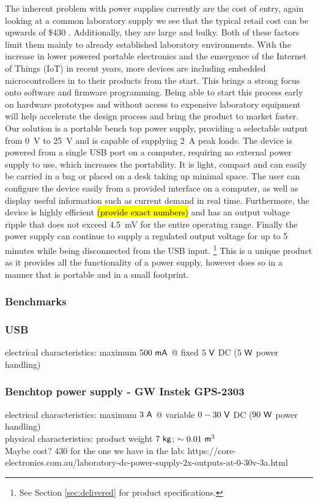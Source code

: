 \newpar
The inherent problem with power supplies currently are the cost of entry, again looking at a common laboratory supply we see that the typical retail cost can be upwards of \$430 \cite{labsupply_price}. Additionally, they are large and bulky. Both of these factors limit them mainly to already established laboratory environments. With the increase in lower powered portable electronics and the emergence of the Internet of Things (IoT) in recent years, more devices are including embedded microcontrollers in to their products from the start. This brings a strong focus onto software and firmware programming. Being able to start this process early on hardware prototypes and without access to expensive laboratory equipment will help accelerate the design process and bring the product to market faster. 
\newpar
Our solution is a portable bench top power supply, providing a selectable output from \SI{0}{V} to \SI{25}{V} and is capable of supplying \SI{2}{A} peak loads. The device is powered from a single USB port on a computer, requiring no external power supply to use, which increases the portability. It is light, compact and can easily be carried in a bag or placed on a desk taking up minimal space. The user can configure the device easily from a provided interface on a computer, as well as display useful information such as current demand in real time. Furthermore, the device is highly efficient \hl{(provide exact numbers)} and has an output voltage ripple that does not exceed \SI{4.5}{mV} for the entire operating range.  Finally the power supply can continue to supply a regulated output voltage for up to 5 minutes while being disconnected from the USB input. \footnote{See Section \ref{sec:delivered} for product specifications.}
\newpar
This is a unique product as it provides all the functionality of a power supply, however does so in a manner that is portable and in a small footprint.
\subsubsection{Benchmarks}
\subsubsection{USB}
electrical characteristics: maximum $500 \ \mathsf{mA}$ @ fixed $5 \ \mathsf{V}$ DC ($5 \ \mathsf{W}$ power handling)
\subsubsection{Benchtop power supply - GW Instek GPS-2303}
electrical characteristics: maximum $3 \ \mathsf{A}$ @ variable $0 - 30 \ \mathsf{V}$ DC ($90 \ \mathsf{W}$ power handling)
~\\
physical characteristics: product weight $7 \ \mathsf{kg}$; $\sim 0.01 \ \mathsf{m}^3$
~\\
Maybe cost? 430 for the one we have in the lab:  https://core-electronics.com.au/laboratory-dc-power-supply-2x-outputs-at-0-30v-3a.html
